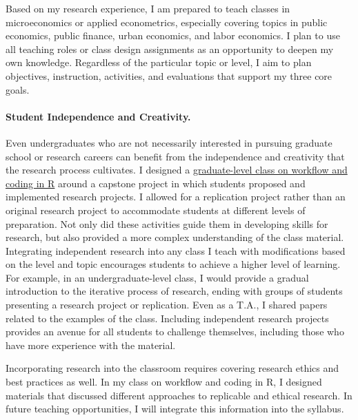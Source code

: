 Based on my research experience, I am prepared to teach classes in microeconomics or applied econometrics, especially covering topics in public economics, public finance, urban economics, and labor economics. I plan to use all teaching roles or class design assignments as an opportunity to deepen my own knowledge. Regardless of the particular topic or level, I aim to plan objectives, instruction, activities, and evaluations that support my three core goals. 

\paragraph{Student Independence and Creativity.} Even undergraduates who are not necessarily interested in pursuing graduate school or research careers can benefit from the independence and creativity that the research process cultivates. I designed a \href{https://github.com/aziff/R-Workflow-for-Economists}{graduate-level class on workflow and coding in R} around a capstone project in which students proposed and implemented research projects. I allowed for a replication project rather than an original research project to accommodate students at different levels of preparation. Not only did these activities guide them in developing skills for research, but also provided a more complex understanding of the class material. Integrating independent research into any class I teach with modifications based on the level and topic encourages students to achieve a higher level of learning. For example, in an undergraduate-level class, I would provide a gradual introduction to the iterative process of research, ending with groups of students presenting a research project or replication. Even as a T.A., I shared papers related to the examples of the class. Including independent research projects provides an avenue for all students to challenge themselves, including those who have more experience with the material. 

Incorporating research into the classroom requires covering research ethics and best practices as well. In my class on workflow and coding in R, I designed materials that discussed different approaches to replicable and ethical research. In future teaching opportunities, I will integrate this information into the syllabus.

